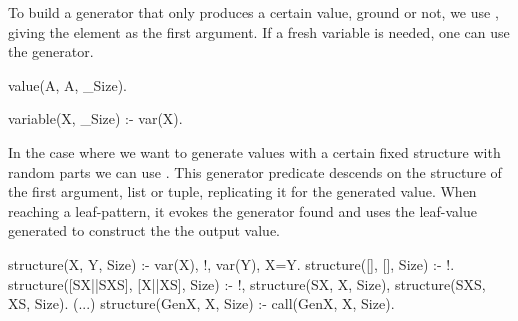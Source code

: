 To build a generator that only produces a certain value, ground or not,
we use , giving the element as the first argument.
%
If a fresh variable is needed, one can use the 
generator.
\begin{yapcode}
 value(A, A, _Size).

 variable(X, _Size) :- var(X).
\end{yapcode}
%
In the case where we want to generate values with a certain fixed
structure with random parts we can use .
%
This generator predicate descends on the structure of the first
argument, list or tuple, replicating it for the generated value.
%
When reaching a leaf-pattern, it evokes the generator found and
uses the leaf-value generated to construct the the output value.
%
\begin{yapcode}
 structure(X, Y, Size) :-
   var(X), !, var(Y), X=Y.
 structure([], [], Size) :- !.
 structure([SX||SXS], [X||XS], Size) :-
   !,
   structure(SX, X, Size),
   structure(SXS, XS, Size).
 (...)
 structure(GenX, X, Size) :-
   call(GenX, X, Size).
\end{yapcode}



\begin{yapcode}
\end{yapcode}

\begin{yapcode}
\end{yapcode}
\begin{yapcode}
\end{yapcode}

